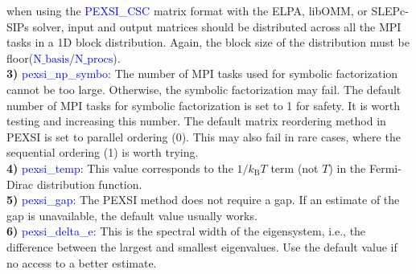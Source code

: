 \documentclass{report}
\begin{document}
when using the \textcolor{blue}{PEXSI\_CSC} matrix format with the ELPA, libOMM, or SLEPc-SIPs solver, input and output matrices should be distributed across all the MPI tasks in a 1D block distribution.  Again, the block size of the distribution must be floor(\textcolor{blue}{$\text{N}\_\text{basis}$}/\textcolor{blue}{$\text{N}\_\text{procs}$}).\\

\textbf{3)} \textcolor{blue}{pexsi\_np\_symbo}:  The number of MPI tasks used for symbolic factorization cannot be too large.  Otherwise, the symbolic factorization may fail.  The default number of MPI tasks for symbolic factorization is set to 1 for safety.  It is worth testing and increasing this number.  The default matrix reordering method in PEXSI is set to parallel ordering (0).  This may also fail in rare cases, where the sequential ordering (1) is worth trying.\\

\textbf{4)} \textcolor{blue}{pexsi\_temp}:  This value corresponds to the $1/k_\text{B} T$ term (not $T$) in the Fermi-Dirac distribution function.\\

\textbf{5)} \textcolor{blue}{pexsi\_gap}:  The PEXSI method does not require a gap.  If an estimate of the gap is unavailable, the default value usually works.\\

\textbf{6)} \textcolor{blue}{pexsi\_delta\_e}:  This is the spectral width of the eigensystem, i.e., the difference between the largest and smallest eigenvalues.  Use the default value if no access to a better estimate.\\
\end{document}
